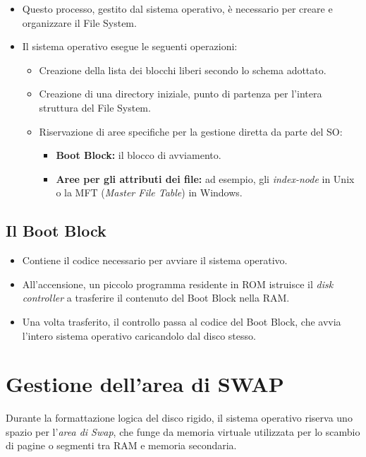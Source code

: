\begin{itemize}
    \item Questo processo, gestito dal sistema operativo, è necessario per creare e organizzare il File System.
    \item Il sistema operativo esegue le seguenti operazioni:
    \begin{itemize}
        \item Creazione della lista dei blocchi liberi secondo lo schema adottato.
        \item Creazione di una directory iniziale, punto di partenza per l’intera struttura del File System.
        \item Riservazione di aree specifiche per la gestione diretta da parte del SO:
        \begin{itemize}
            \item \textbf{Boot Block:} il blocco di avviamento.
            \item \textbf{Aree per gli attributi dei file:} ad esempio, gli \textit{index-node} in Unix o la MFT (\textit{Master File Table}) in Windows.
        \end{itemize}
    \end{itemize}
\end{itemize}

\subsection{Il Boot Block}

\begin{itemize}
    \item Contiene il codice necessario per avviare il sistema operativo.
    \item All’accensione, un piccolo programma residente in ROM istruisce il \textit{disk controller} a trasferire il contenuto del Boot Block nella RAM.
    \item Una volta trasferito, il controllo passa al codice del Boot Block, che avvia l’intero sistema operativo caricandolo dal disco stesso.
\end{itemize}

\section{Gestione dell'area di SWAP}
Durante la formattazione logica del disco rigido, il sistema operativo riserva uno spazio per l'\textit{area di Swap}, che funge da memoria virtuale utilizzata per lo scambio di pagine o segmenti tra RAM e memoria secondaria.

